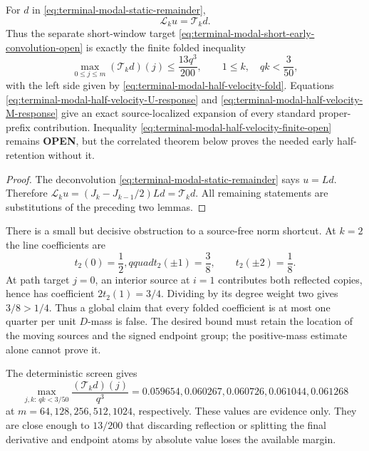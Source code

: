 \begin{corollary}
\label{cor:terminal-modal-half-velocity-certificate}
For $d$ in \eqref{eq:terminal-modal-static-remainder},
\begin{equation}
 \mathcal L_ku=\mathcal T_kd.
 \label{eq:terminal-modal-half-velocity-static-identity}
\end{equation}
Thus the separate short-window target
\eqref{eq:terminal-modal-short-early-convolution-open} is exactly the finite
folded inequality
\begin{equation}
 \max_{0\le j\le m}(\mathcal T_kd)(j)\le\frac{13q^3}{200},
 \qquad1\le k,\quad qk<\frac3{50},
 \label{eq:terminal-modal-half-velocity-finite-open}
\end{equation}
with the left side given by
\eqref{eq:terminal-modal-half-velocity-fold}.  Equations
\eqref{eq:terminal-modal-half-velocity-U-response} and
\eqref{eq:terminal-modal-half-velocity-M-response} give an exact
source-localized expansion of every standard proper-prefix contribution.
Inequality \eqref{eq:terminal-modal-half-velocity-finite-open} remains
\textbf{OPEN}, but the correlated theorem below proves the needed early
half-retention without it.
\end{corollary}

\begin{proof}
The deconvolution \eqref{eq:terminal-modal-static-remainder} says $u=Ld$.
Therefore
$\mathcal L_ku=(J_k-J_{k-1}/2)Ld=\mathcal T_kd$.
All remaining statements are substitutions of the preceding two lemmas.
\end{proof}

There is a small but decisive obstruction to a source-free norm shortcut.
At $k=2$ the line coefficients are
\begin{equation}
 t_2(0)=\frac12,qquad t_2(\mathord\pm1)=\frac38,
 \qquad t_2(\mathord\pm2)=\frac18.
 \label{eq:terminal-modal-half-velocity-k2}
\end{equation}
At path target $j=0$, an interior source at $i=1$ contributes both reflected
copies, hence has coefficient $2t_2(1)=3/4$.  Dividing by its degree weight
two gives $3/8>1/4$.  Thus a global claim that every folded coefficient is at
most one quarter per unit $D$-mass is false.  The desired bound must retain
the location of the moving sources and the signed endpoint group; the
positive-mass estimate alone cannot prove it.

The deterministic screen gives
\[
 \max_{j,k:\,qk<3/50}\frac{(\mathcal T_kd)(j)}{q^3}
 =0.059654,0.060267,0.060726,0.061044,0.061268
\]
at $m=64,128,256,512,1024$, respectively.  These values are evidence only.
They are close enough to $13/200$ that discarding reflection or splitting the
final derivative and endpoint atoms by absolute value loses the available
margin.
